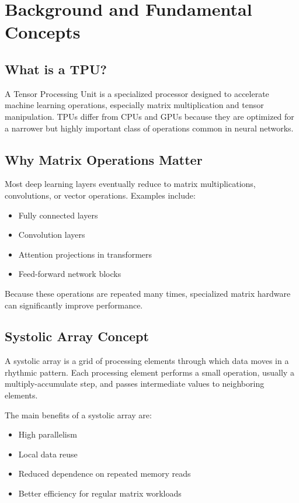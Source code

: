 \documentclass[12pt,a4paper]{article}
\begin{document}
	\section{Background and Fundamental Concepts}
	
	\subsection{What is a TPU?}
	A Tensor Processing Unit is a specialized processor designed to accelerate machine learning operations, especially matrix multiplication and tensor manipulation. TPUs differ from CPUs and GPUs because they are optimized for a narrower but highly important class of operations common in neural networks.
	
	\subsection{Why Matrix Operations Matter}
	Most deep learning layers eventually reduce to matrix multiplications, convolutions, or vector operations. Examples include:
	\begin{itemize}[itemsep=2pt, topsep=4pt]
		\item Fully connected layers
		\item Convolution layers
		\item Attention projections in transformers
		\item Feed-forward network blocks
	\end{itemize}
	
	Because these operations are repeated many times, specialized matrix hardware can significantly improve performance.
	
	\subsection{Systolic Array Concept}
	A systolic array is a grid of processing elements through which data moves in a rhythmic pattern. Each processing element performs a small operation, usually a multiply-accumulate step, and passes intermediate values to neighboring elements.
	
	The main benefits of a systolic array are:
	\begin{itemize}[itemsep=2pt, topsep=4pt]
		\item High parallelism
		\item Local data reuse
		\item Reduced dependence on repeated memory reads
		\item Better efficiency for regular matrix workloads
	\end{itemize}
	
\end{document}
